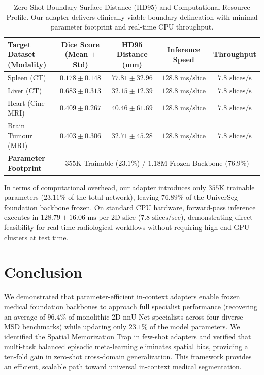 \documentclass[runningheads]{llncs}
\begin{document}
\begin{table}[t]
\centering
\caption{Zero-Shot Boundary Surface Distance (HD95) and Computational Resource Profile. Our adapter delivers clinically viable boundary delineation with minimal parameter footprint and real-time CPU throughput.}
\label{tab:hd95_compute}
\begin{tabular}{lcccc}
\toprule
\textbf{Target Dataset (Modality)} & \textbf{Dice Score (Mean $\pm$ Std)} & \textbf{HD95 Distance (mm)} & \textbf{Inference Speed} & \textbf{Throughput} \\
\midrule
Spleen (CT)           & $0.178 \pm 0.148$ & $77.81 \pm 32.96$ & $128.8\text{ ms/slice}$ & $7.8\text{ slices/s}$ \\
Liver (CT)            & $0.683 \pm 0.313$ & $32.15 \pm 12.39$ & $128.8\text{ ms/slice}$ & $7.8\text{ slices/s}$ \\
Heart (Cine MRI)      & $0.409 \pm 0.267$ & $40.46 \pm 61.69$ & $128.8\text{ ms/slice}$ & $7.8\text{ slices/s}$ \\
Brain Tumour (MRI)    & $0.403 \pm 0.306$ & $32.71 \pm 45.28$ & $128.8\text{ ms/slice}$ & $7.8\text{ slices/s}$ \\
\midrule
\textbf{Parameter Footprint} & \multicolumn{4}{c}{$355\text{K}$ Trainable ($23.1\%$) / $1.18\text{M}$ Frozen Backbone ($76.9\%$)} \\
\bottomrule
\end{tabular}
\end{table}

In terms of computational overhead, our adapter introduces only $355\text{K}$ trainable parameters ($23.11\%$ of the total network), leaving $76.89\%$ of the UniverSeg foundation backbone frozen. On standard CPU hardware, forward-pass inference executes in $128.79 \pm 16.06\text{ ms}$ per 2D slice ($7.8\text{ slices/sec}$), demonstrating direct feasibility for real-time radiological workflows without requiring high-end GPU clusters at test time.

\section{Conclusion}
\label{sec:conclusion}
We demonstrated that parameter-efficient in-context adapters enable frozen medical foundation backbones to approach full specialist performance (recovering an average of $96.4\%$ of monolithic 2D nnU-Net specialists across four diverse MSD benchmarks) while updating only $23.1\%$ of the model parameters. We identified the Spatial Memorization Trap in few-shot adapters and verified that multi-task balanced episodic meta-learning eliminates spatial bias, providing a ten-fold gain in zero-shot cross-domain generalization. This framework provides an efficient, scalable path toward universal in-context medical segmentation.
\end{document}
